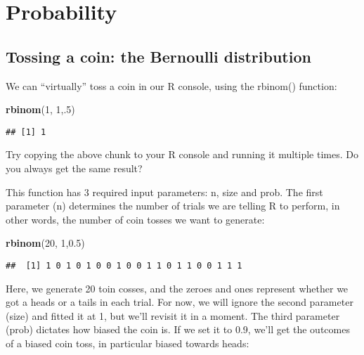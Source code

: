\documentclass[
]{book}
\newenvironment{Shaded}{\begin{snugshade}}{\end{snugshade}}
\newcommand{\DecValTok}[1]{\textcolor[rgb]{0.00,0.00,0.81}{#1}}
\newcommand{\FloatTok}[1]{\textcolor[rgb]{0.00,0.00,0.81}{#1}}
\newcommand{\KeywordTok}[1]{\textcolor[rgb]{0.13,0.29,0.53}{\textbf{#1}}}
\newcommand{\NormalTok}[1]{#1}
\begin{document}
\hypertarget{prob}{%
\chapter{Probability}\label{prob}}

\hypertarget{tossing-a-coin-the-bernoulli-distribution}{%
\section{Tossing a coin: the Bernoulli distribution}\label{tossing-a-coin-the-bernoulli-distribution}}

We can ``virtually'' toss a coin in our R console, using the rbinom() function:

\begin{Shaded}
\begin{Highlighting}[]
\KeywordTok{rbinom}\NormalTok{(}\DecValTok{1}\NormalTok{, }\DecValTok{1}\NormalTok{,.}\DecValTok{5}\NormalTok{)}
\end{Highlighting}
\end{Shaded}

\begin{verbatim}
## [1] 1
\end{verbatim}

Try copying the above chunk to your R console and running it multiple times. Do you always get the same result?

This function has 3 required input parameters: n, size and prob. The first parameter (n) determines the number of trials we are telling R to perform, in other words, the number of coin tosses we want to generate:

\begin{Shaded}
\begin{Highlighting}[]
\KeywordTok{rbinom}\NormalTok{(}\DecValTok{20}\NormalTok{, }\DecValTok{1}\NormalTok{,}\FloatTok{0.5}\NormalTok{)}
\end{Highlighting}
\end{Shaded}

\begin{verbatim}
##  [1] 1 0 1 0 1 0 0 1 0 0 1 1 0 1 1 0 0 1 1 1
\end{verbatim}

Here, we generate 20 toin cosses, and the zeroes and ones represent whether we got a heads or a tails in each trial. For now, we will ignore the second parameter (size) and fitted it at 1, but we'll revisit it in a moment. The third parameter (prob) dictates how biased the coin is. If we set it to 0.9, we'll get the outcomes of a biased coin toss, in particular biased towards heads:
\end{document}

